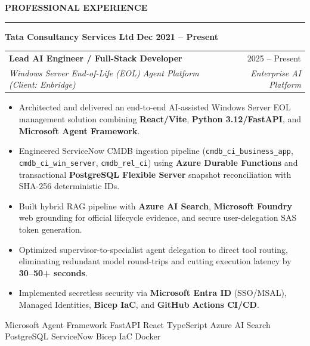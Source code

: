 \documentclass[10pt,a4paper]{article}
\newcommand{\sectiontitle}[1]{%
    \vspace{4pt}
    {\normalsize\textbf{\uppercase{\textcolor{primary}{#1}}}}
    \vspace{-3pt}
    \par\textcolor{primary}{\rule{\textwidth}{0.6pt}}
    \vspace{2pt}
}
\newcommand{\skilltag}[1]{%
    \colorbox{tagbg}{\scriptsize\textcolor{tagtxt}{\textsf{#1}}}\hspace{1.5pt}%
}
\begin{document}
\sectiontitle{Professional Experience}

{\normalsize\textbf{\textcolor{primary}{Tata Consultancy Services Ltd}}} \hfill {\footnotesize\textbf{\textcolor{subtitle}{Dec 2021 -- Present}}}
\vspace{1pt}

\begin{tabular*}{\textwidth}{@{\extracolsep{\fill}}lr@{}}
{\small\textbf{Lead AI Engineer / Full-Stack Developer}} & {\footnotesize\textcolor{subtitle}{2025 -- Present}} \\
{\footnotesize\textit{Windows Server End-of-Life (EOL) Agent Platform (Client: Enbridge)}} & {\footnotesize\textit{\textcolor{subtitle}{Enterprise AI Platform}}}
\end{tabular*}
{\footnotesize
\begin{itemize}
    \item Architected and delivered an end-to-end AI-assisted Windows Server EOL management solution combining \textbf{React/Vite}, \textbf{Python 3.12/FastAPI}, and \textbf{Microsoft Agent Framework}.
    \item Engineered ServiceNow CMDB ingestion pipeline (\texttt{cmdb\_ci\_business\_app}, \texttt{cmdb\_ci\_win\_server}, \texttt{cmdb\_rel\_ci}) using \textbf{Azure Durable Functions} and transactional \textbf{PostgreSQL Flexible Server} snapshot reconciliation with SHA-256 deterministic IDs.
    \item Built hybrid RAG pipeline with \textbf{Azure AI Search}, \textbf{Microsoft Foundry} web grounding for official lifecycle evidence, and secure user-delegation SAS token generation.
    \item Optimized supervisor-to-specialist agent delegation to direct tool routing, eliminating redundant model round-trips and cutting execution latency by \textbf{30--50+ seconds}.
    \item Implemented secretless security via \textbf{Microsoft Entra ID} (SSO/MSAL), Managed Identities, \textbf{Bicep IaC}, and \textbf{GitHub Actions CI/CD}.
\end{itemize}
}
\skilltag{Microsoft Agent Framework} \skilltag{FastAPI} \skilltag{React} \skilltag{TypeScript} \skilltag{Azure AI Search} \skilltag{PostgreSQL} \skilltag{ServiceNow} \skilltag{Bicep IaC} \skilltag{Docker}

\vspace{3pt}
\end{document}
